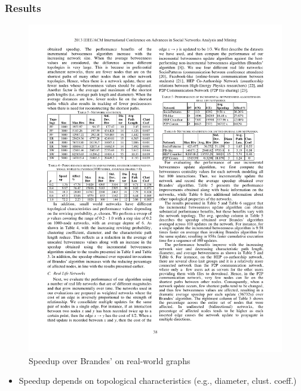 \begin{frame}
  \frametitle{Results}

  \begin{figure}[t]
    \centering
    \includegraphics[width=\textwidth, height=0.7\textheight, keepaspectratio]{imgs/kas-results1}
    \caption{Speedup over Brandes' on real-world graphs}
  \end{figure}

  \begin{itemize}
    \item Speedup depends on topological characteristics (e.g., diameter, clust. coeff.)
  \end{itemize}

\end{frame}


